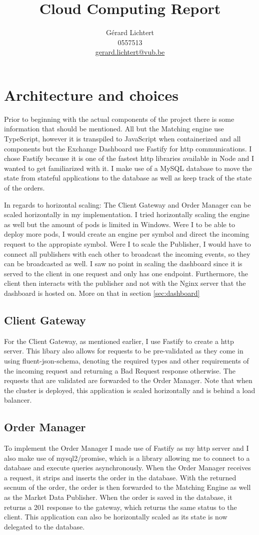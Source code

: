 \documentclass{article}
\title{Cloud Computing Report}
\author{Gérard Lichtert \\
0557513\\
\href{mailto:gerard.lichtert@vub.be}{gerard.lichtert@vub.be}
}
\begin{document}
\maketitle
\tableofcontents
\newpage
\raggedright
\section{Architecture and choices}
Prior to beginning with the actual components of the project there is some information that should be mentioned.
All but the Matching engine use TypeScript, however it is transpiled to JavaScript when containerized and all components but the Exchange Dashboard use Fastify for http communications.
I chose Fastify because it is one of the fastest http libraries available in Node and I wanted to get familiarized with it.
I make use of a MySQL database to move the state from stateful applications to the database as well as keep track of the state of the orders.
\par
In regards to horizontal scaling: The Client Gateway and Order Manager can be scaled horizontally in my implementation.
I tried horizontally scaling the engine as well but the amount of pods is limited in Windows.
Were I to be able to deploy more pods, I would create an engine per symbol and direct the incoming request to the appropiate symbol.
Were I to scale the Publisher, I would have to connect all publishers with each other to broadcast the incoming events, so they can be broadcasted as well.
I saw no point in scaling the dashboard since it is served to the client in one request and only has one endpoint.
Furthermore, the client then interacts with the publisher and not with the Nginx server that the dashboard is hosted on. More on that in section \ref{sec:dashboard}
\subsection{Client Gateway}
For the Client Gateway, as mentioned earlier, I use Fastify to create a http server.
This libary also allows for requests to be pre-validated as they come in using fluent-json-schema, denoting the required types and other requirements of the incoming request and returning a Bad Request response otherwise.
The requests that are validated are forwarded to the Order Manager.
Note that when the cluster is deployed, this application is scaled horizontally and is behind a load balancer.
\subsection{Order Manager}
To implement the Order Manager I made use of Fastify as my http server and I also make use of mysql2/promise, which is a library allowing me to connect to a database and execute queries asynchronously. When the Order Manager receives a request, it strips and inserts the order in the database. With the returned secnum of the order, the order is then forwarded to the Matching Engine as well as the Market Data Publisher. When the order is saved in the database, it returns a 201 response to the gateway, which returns the same status to the client.
This application can also be horizontally scaled as its state is now delegated to the database.
\end{document}
